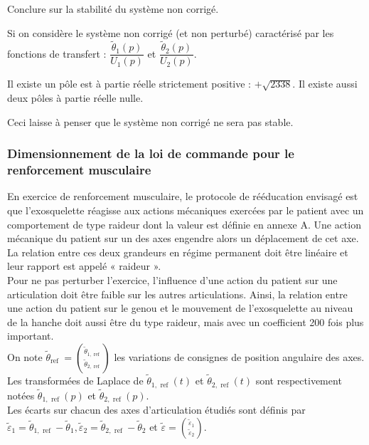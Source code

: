 \begin{question}
\label{2023_ccs_psi_q_24}
Conclure sur la stabilité du système non corrigé.
\end{question}
\ifprof
\begin{corrige}

Si on considère le système non corrigé (et non perturbé) caractérisé par les fonctions de transfert : $\dfrac{\tilde{\theta}_1(p)}{U_1(p)}$ et $\dfrac{\tilde{\theta}_2(p)}{U_2(p)}$.

Il existe un pôle est à partie réelle strictement positive : $+\sqrt{2338}$. Il existe aussi deux pôles à partie réelle nulle.

Ceci laisse à penser que le système non corrigé ne sera pas stable.
\end{corrige}
\else
\fi


\subsubsection{Dimensionnement de la loi de commande pour le renforcement musculaire}
En exercice de renforcement musculaire, le protocole de rééducation envisagé est que l'exosquelette réagisse aux actions mécaniques exercées par le patient avec un comportement de type raideur dont la valeur est définie en annexe A. Une action mécanique du patient sur un des axes engendre alors un déplacement de cet axe. La relation entre ces deux grandeurs en régime permanent doit être linéaire et leur rapport est appelé « raideur ».\\
Pour ne pas perturber l'exercice, l'influence d'une action du patient sur une articulation doit être faible sur les autres articulations. Ainsi, la relation entre une action du patient sur le genou et le mouvement de l'exosquelette au niveau de la hanche doit aussi être du type raideur, mais avec un coefficient 200 fois plus important.\\
On note $\tilde{\theta}_{\text {ref }}=\binom{\tilde{\theta}_{1, \text { ref }}}{\tilde{\theta}_{2, \text { ref }}}$ les variations de consignes de position angulaire des axes. Les transformées de Laplace de $\tilde{\theta}_{1, \text { ref }}(t)$ et $\tilde{\theta}_{2, \text { ref }}(t)$ sont respectivement notées $\tilde{\theta}_{1, \text { ref }}(p)$ et $\tilde{\theta}_{2, \text { ref }}(p)$.\\
Les écarts sur chacun des axes d'articulation étudiés sont définis par $\tilde{\varepsilon}_{1}=\tilde{\theta}_{1, \text { ref }}-\tilde{\theta}_{1}, \tilde{\varepsilon}_{2}=\tilde{\theta}_{2, \text { ref }}-\tilde{\theta}_{2}$ et $\tilde{\varepsilon}=\binom{\tilde{\varepsilon}_{1}}{\tilde{\varepsilon}_{2}}$.\\


